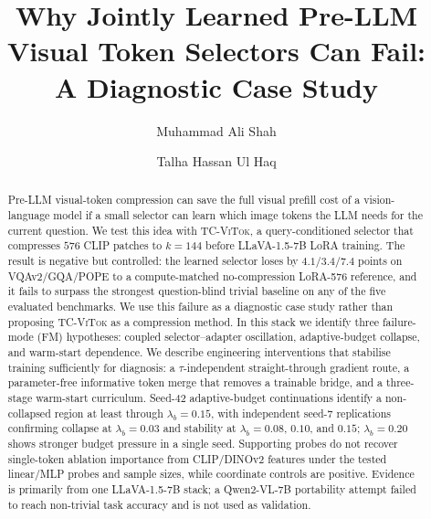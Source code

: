 \documentclass[runningheads]{llncs}
\newcommand{\lbb}{\lambda_b}
\begin{document}
\setlength{\abovedisplayskip}{5pt}
\setlength{\belowdisplayskip}{5pt}
\setlength{\abovedisplayshortskip}{3pt}
\setlength{\belowdisplayshortskip}{3pt}

\title{Why Jointly Learned Pre-LLM\\
       Visual Token Selectors Can Fail:\\
       A Diagnostic Case Study}

\author{Muhammad Ali Shah \and Talha Hassan Ul Haq}

\maketitle

\begin{abstract}
Pre-LLM visual-token compression can save the full visual prefill cost
of a vision-language model if a small selector can learn which image
tokens the LLM needs for the current question. We test this idea with
\textsc{TC-ViTok}, a query-conditioned selector that compresses
$576$ CLIP patches to $k{=}144$ before LLaVA-1.5-7B LoRA training.
The result is negative but controlled: the learned selector loses by
$4.1/3.4/7.4$ points on VQAv2/GQA/POPE to a compute-matched
no-compression LoRA-576 reference, and it fails to surpass the strongest
question-blind trivial baseline on any of the five evaluated
benchmarks. We use this
failure as a diagnostic case study rather than proposing
\textsc{TC-ViTok} as a compression method. In this stack we identify
three failure-mode (FM) hypotheses: coupled selector--adapter oscillation,
adaptive-budget collapse, and warm-start dependence. We describe
engineering interventions that stabilise training sufficiently for diagnosis: a
$\tau$-independent straight-through gradient route, a parameter-free
informative token merge that removes a trainable bridge, and a
three-stage warm-start curriculum. Seed-42 adaptive-budget
continuations identify a non-collapsed region at least through
$\lbb{=}0.15$, with independent seed-7 replications confirming collapse
at $\lbb{=}0.03$ and stability at $\lbb{=}0.08$, $0.10$, and $0.15$;
$\lbb{=}0.20$ shows stronger budget pressure in a single seed.
Supporting probes do not recover single-token ablation
importance from CLIP/DINOv2 features under the tested linear/MLP
probes and sample sizes, while coordinate controls are positive.
Evidence is primarily from one LLaVA-1.5-7B stack; a Qwen2-VL-7B
portability attempt failed to reach non-trivial task accuracy and is
not used as validation.

\end{abstract}
\end{document}
